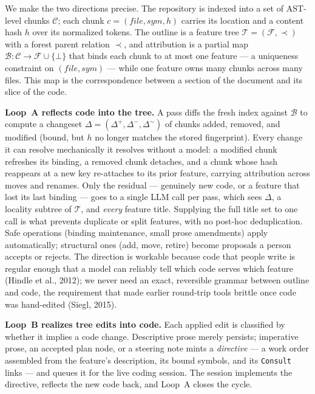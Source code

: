 \documentclass[sigconf,nonacm]{acmart}
\begin{document}
We make the two directions precise. The repository is indexed into a set of
AST-level chunks $\mathcal{C}$; each chunk $c = (\mathit{file}, \mathit{sym}, h)$
carries its location and a content hash $h$ over its normalized tokens. The
outline is a feature tree $\mathcal{T} = (\mathcal{F}, \prec)$ with a forest
parent relation $\prec$, and attribution is a partial map
$\mathcal{B} \colon \mathcal{C} \to \mathcal{F} \cup \{\bot\}$ that binds each
chunk to at most one feature --- a uniqueness constraint on
$(\mathit{file}, \mathit{sym})$ --- while one feature owns many chunks across many
files. This map is the correspondence between a section of the document and its
slice of the code.

\textbf{Loop~A reflects code into the tree.} A pass diffs the fresh index against
$\mathcal{B}$ to compute a changeset
$\Delta = (\Delta^{+}, \Delta^{-}, \Delta^{\sim})$ of chunks added, removed, and
modified (bound, but $h$ no longer matches the stored fingerprint). Every change
it can resolve mechanically it resolves without a model: a modified chunk
refreshes its binding, a removed chunk detaches, and a chunk whose hash reappears
at a new key re-attaches to its prior feature, carrying attribution across moves
and renames. Only the residual --- genuinely new code, or a feature that lost its
last binding --- goes to a single LLM call per pass, which sees $\Delta$, a
locality subtree of $\mathcal{T}$, and \emph{every} feature title. Supplying the
full title set to one call is what prevents duplicate or split features, with no
post-hoc deduplication. Safe operations (binding maintenance, small prose
amendments) apply automatically; structural ones (add, move, retire) become
proposals a person accepts or rejects. The direction is workable because code that
people write is regular enough that a model can reliably tell which code serves
which feature (Hindle et al., 2012); we never need an exact, reversible grammar
between outline and code, the requirement that made earlier round-trip tools
brittle once code was hand-edited (Siegl, 2015).

\textbf{Loop~B realizes tree edits into code.} Each applied edit is classified by
whether it implies a code change. Descriptive prose merely persists; imperative
prose, an accepted plan node, or a steering note mints a \emph{directive} --- a
work order assembled from the feature's description, its bound symbols, and its
\texttt{Consult} links --- and queues it for the live coding session. The session
implements the directive, reflects the new code back, and Loop~A closes the cycle.
\end{document}
